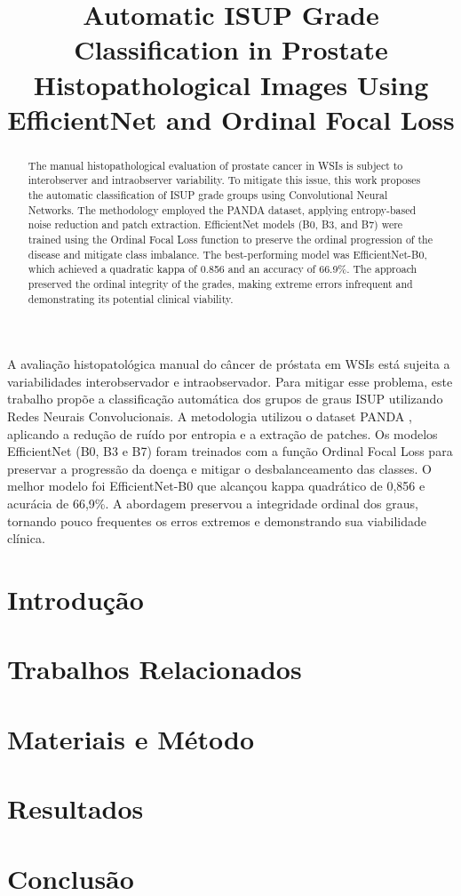 \documentclass[12pt]{article}
\title{Automatic ISUP Grade Classification in Prostate Histopathological Images Using EfficientNet and Ordinal Focal Loss}
\author{}
\begin{document}
 

\maketitle

\begin{abstract}
The manual histopathological evaluation of prostate cancer in WSIs is subject to interobserver and intraobserver variability. To mitigate this issue, this work proposes the automatic classification of ISUP grade groups using Convolutional Neural Networks. The methodology employed the PANDA dataset, applying entropy-based noise reduction and patch extraction. EfficientNet models (B0, B3, and B7) were trained using the Ordinal Focal Loss function to preserve the ordinal progression of the disease and mitigate class imbalance. The best-performing model was EfficientNet-B0, which achieved a quadratic kappa of 0.856 and an accuracy of 66.9\%. The approach preserved the ordinal integrity of the grades, making extreme errors infrequent and demonstrating its potential clinical viability.
\end{abstract}
     
\begin{resumo}
A avaliação histopatológica manual do câncer de próstata em WSIs está sujeita a variabilidades interobservador e intraobservador. Para mitigar esse problema, este trabalho propõe a classificação automática dos grupos de graus ISUP utilizando Redes Neurais Convolucionais. A metodologia utilizou o dataset PANDA , aplicando a redução de ruído por entropia e a extração de patches. Os modelos EfficientNet (B0, B3 e B7) foram treinados com a função Ordinal Focal Loss para preservar a progressão da doença e mitigar o desbalanceamento das classes. O melhor modelo foi EfficientNet-B0 que alcançou kappa quadrático de 0,856 e acurácia de 66,9\%. A abordagem preservou a integridade ordinal dos graus, tornando pouco frequentes os erros extremos e demonstrando sua viabilidade clínica.
\end{resumo}


\section{Introdução}


\section{Trabalhos Relacionados} \label{sec:related-work}


\section{Materiais e Método}
\label{sec:method}


\section{Resultados}
\label{sec:results}


\section{Conclusão}




\end{document}
